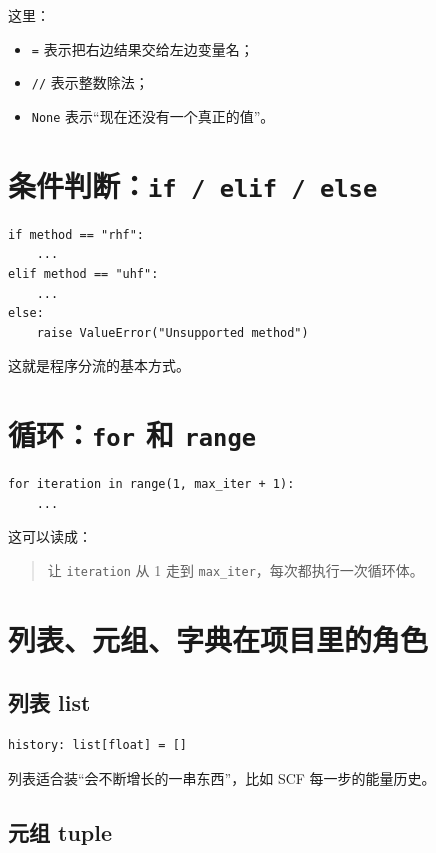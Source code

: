 \documentclass[UTF8,11pt,fontset=fandol]{ctexbook}
\begin{document}
这里：
\begin{itemize}
  \item \texttt{=} 表示把右边结果交给左边变量名；
  \item \texttt{//} 表示整数除法；
  \item \texttt{None} 表示“现在还没有一个真正的值”。
\end{itemize}

\section{条件判断：\texttt{if / elif / else}}

\begin{lstlisting}[style=pythonstyle]
if method == "rhf":
    ...
elif method == "uhf":
    ...
else:
    raise ValueError("Unsupported method")
\end{lstlisting}

这就是程序分流的基本方式。

\section{循环：\texttt{for} 和 \texttt{range}}

\begin{lstlisting}[style=pythonstyle]
for iteration in range(1, max_iter + 1):
    ...
\end{lstlisting}

这可以读成：

\begin{quote}
让 \texttt{iteration} 从 1 走到 \texttt{max\_iter}，每次都执行一次循环体。
\end{quote}

\section{列表、元组、字典在项目里的角色}

\subsection*{列表 list}

\begin{lstlisting}[style=pythonstyle]
history: list[float] = []
\end{lstlisting}

列表适合装“会不断增长的一串东西”，比如 SCF 每一步的能量历史。

\subsection*{元组 tuple}
\end{document}
